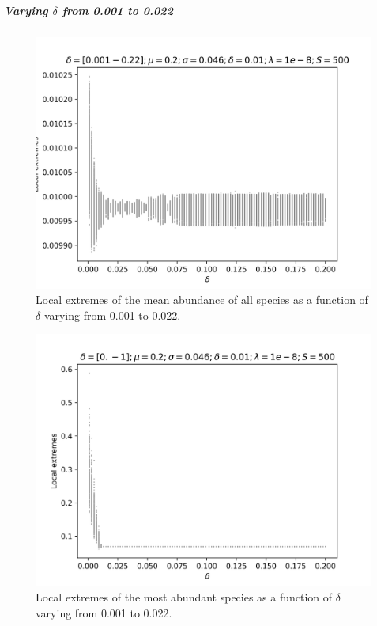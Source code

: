 \documentclass[11pt,a4paper,fleqn]{scrartcl}
\begin{document}
\subparagraph{Varying $\delta$ from 0.001 to 0.022}

\begin{figure}[H]
    \centering
    \includegraphics[width=\linewidth]{Bifurcation/BifurcationMeanDelta.png}
    \caption{Local extremes of the mean abundance of all species as a function of $\delta$ varying from 0.001 to 0.022.}
\end{figure}

\begin{figure}[H]
    \centering
    \includegraphics[width=\linewidth]{Bifurcation/BifurcationM1Delta.png}
    \caption{Local extremes of the most abundant species as a function of $\delta$ varying from 0.001 to 0.022.}
\end{figure}
\clearpage
\end{document}
